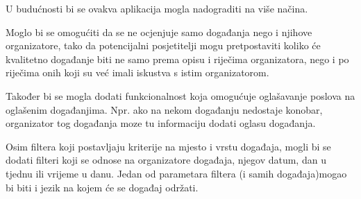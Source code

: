 	U budućnosti bi se ovakva aplikacija mogla nadograditi na više načina.
 
	Moglo bi se omogućiti da se ne ocjenjuje samo događanja nego i njihove organizatore, tako da potencijalni posjetitelji mogu pretpostaviti koliko će kvalitetno događanje biti ne samo prema opisu i riječima organizatora, nego i po riječima onih koji su već imali iskustva s istim organizatorom.
 
	Također bi se mogla dodati funkcionalnost koja omogućuje oglašavanje poslova na oglašenim događanjima. Npr. ako na nekom događanju nedostaje konobar, organizator tog događanja moze tu informaciju dodati oglasu događanja. 
 
	Osim filtera koji postavljaju kriterije na mjesto i vrstu događaja, mogli bi se dodati filteri koji se odnose na organizatore događaja, njegov datum, dan u tjednu ili vrijeme u danu. Jedan od parametara filtera (i samih događaja)mogao bi biti i jezik na kojem će se događaj održati.

			
		
		
